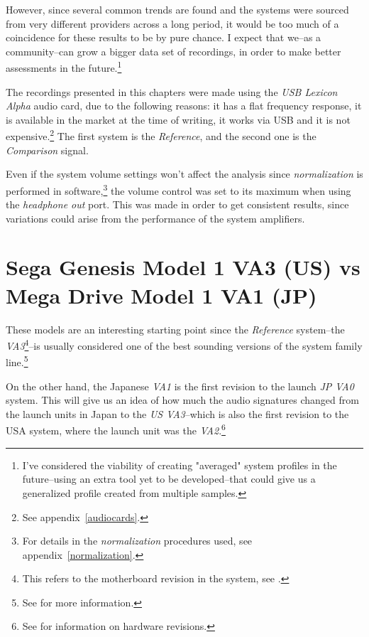 \documentclass[10pt,a4paper]{report}
\begin{document}
However, since several common trends are found and the systems were sourced from very different providers across a long period, it would be too much of a coincidence for these results to be by pure chance. I expect that we--as a community--can grow a bigger data set of recordings, in order to make better assessments in the future.\footnote{I've considered the viability of creating "averaged" system profiles in the future--using an extra tool yet to be developed--that could give us a generalized profile created from multiple samples.}

The recordings presented in this chapters were made using the \textit{USB Lexicon Alpha} audio card, due to the following reasons: it has a flat frequency response, it is available in the market at the time of writing, it works via USB and it is not expensive.\footnote{See appendix~\ref{audiocards}.} The first system is the \textit{Reference}, and the second one is the \textit{Comparison} signal.

Even if the system volume settings won't affect the analysis since \textit{normalization} is performed in software,\footnote{For details in the \textit{normalization} procedures used, see appendix~\ref{normalization}.} the volume control was set to its maximum when using the \textit{headphone out} port. This was made in order to get consistent results, since variations could arise from the performance of the system amplifiers.

\section{Sega Genesis Model 1 VA3 (US) vs\\ Mega Drive Model 1 VA1 (JP)}

These models are an interesting starting point since the \textit{Reference} system--the \textit{VA3}\footnote{This refers to the motherboard revision in the system, see \cite{genesisaudio}.}--is usually considered one of the best sounding versions of the system family line.\footnote{See \cite{genesisaudio2} for more information.}

On the other hand, the Japanese \textit{VA1} is the first revision to the launch \textit{JP VA0} system. This will give us an idea of how much the audio signatures changed from the launch units in Japan to the \textit{US VA3}--which is also the first revision to the USA system, where the launch unit was the \textit{VA2}.\footnote{See \cite{genesishw} for information on hardware revisions.}
\end{document}
